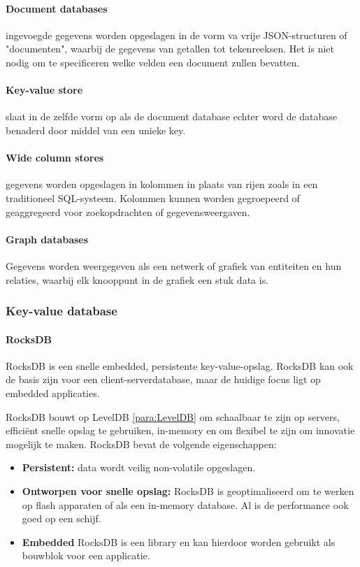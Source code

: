 \paragraph{Document databases} ingevoegde gegevens worden opgeslagen in de vorm va vrije JSON-structuren of "documenten", waarbij de gegevens van getallen tot tekenreeksen. Het is niet nodig om te specificeren welke velden een document zullen bevatten.

\paragraph{Key-value store} slaat in de zelfde vorm op als de document database echter word de database benaderd door middel van een unieke key.

\paragraph{Wide column stores} gegevens worden opgeslagen in kolommen in plaats van rijen zoals in een traditioneel SQL-systeem. Kolommen kunnen worden gegroepeerd of geaggregeerd voor zoekopdrachten of gegevensweergaven.

\paragraph{Graph databases} Gegevens worden weergegeven als een netwerk of grafiek van entiteiten en hun relaties, waarbij elk knooppunt in de grafiek een stuk data is.

\subsubsection{Key-value database}

\paragraph{RocksDB} RocksDB is een snelle embedded, persistente key-value-opslag. RocksDB kan ook de basis zijn voor een client-serverdatabase, maar de huidige focus ligt op embedded applicaties.

RocksDB bouwt op LevelDB \eqref{para:LevelDB} om schaalbaar te zijn op servers, efficiënt snelle opslag te gebruiken, in-memory en om flexibel te zijn om innovatie mogelijk te maken. RocksDB bevat de volgende eigenschappen:
\begin{itemize}[noitemsep]
    \item \textbf{Persistent:} data wordt veilig non-volatile opgeslagen.
    \item \textbf{Ontworpen voor snelle opslag:} RocksDB is geoptimaliseerd om te werken op flash apparaten of als een in-memory database. Al is de performance ook goed op een schijf.
    \item \textbf{Embedded} RocksDB is een library en kan hierdoor worden gebruikt als bouwblok voor een applicatie.
\end{itemize}


